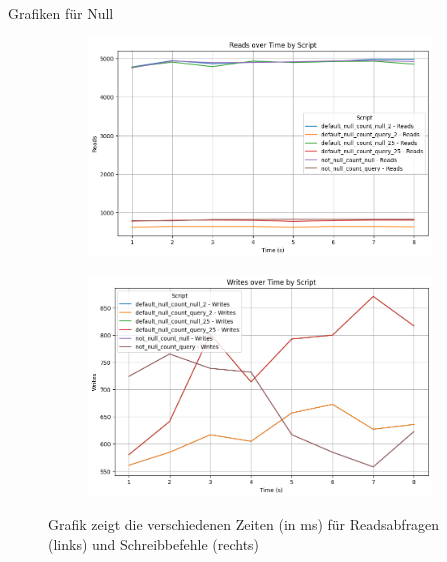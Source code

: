 Grafiken für Null
\begin{figure}[!ht]
    \centering
    \begin{subfigure}[t]{0.48\textwidth}
        \centering
        \includegraphics[width=\textwidth]{PNGs/Data_Types/Null/Reads}
        \label{data-types-null-reads}
    \end{subfigure}
    \hfill
    \begin{subfigure}[t]{0.48\textwidth}
        \centering
        \includegraphics[width=\textwidth]{PNGs/Data_Types/Null/Writes}
        \label{data-types-null-writes}
    \end{subfigure}
    \caption[Data-Types-Null: Reads und Writes]{Grafik zeigt die verschiedenen Zeiten (in ms) für Readsabfragen (links) und Schreibbefehle (rechts)}
    \label{fig:data-types-null-measures}
\end{figure}

